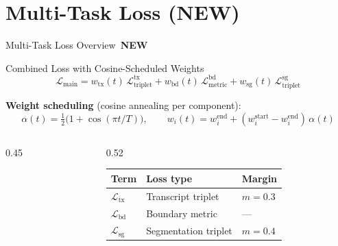 \documentclass[aspectratio=169,10pt]{beamer}
\newcommand{\Lcal}{\mathcal{L}}
\newcommand{\NEW}{\,{\scriptsize\colorbox{newgreen}{\color{white}\textbf{NEW}}}\,}
\begin{document}
\section{Multi-Task Loss (NEW)}

\begin{frame}{Multi-Task Loss Overview \NEW}

\begin{block}{Combined Loss with Cosine-Scheduled Weights}
\vspace{-0.2cm}
\[
  \Lcal_{\text{main}} = w_{\text{tx}}(t)\,\Lcal_{\text{triplet}}^{\text{tx}} + w_{\text{bd}}(t)\,\Lcal_{\text{metric}}^{\text{bd}} + w_{\text{sg}}(t)\,\Lcal_{\text{triplet}}^{\text{sg}}
\]
\end{block}

\textbf{Weight scheduling} (cosine annealing per component):
\[
  \alpha(t) = \tfrac{1}{2}\big(1 + \cos(\pi t / T)\big), \qquad w_i(t) = w_i^{\text{end}} + (w_i^{\text{start}} - w_i^{\text{end}})\,\alpha(t)
\]

\begin{columns}[T]
\begin{column}{0.45\textwidth}
\begin{center}
\end{center}
\end{column}
\begin{column}{0.52\textwidth}
{\small
\begin{tabular}{@{}lll@{}}
\textbf{Term} & \textbf{Loss type} & \textbf{Margin} \\
\midrule
$\Lcal_{\text{tx}}$ & Transcript triplet & $m=0.3$ \\
$\Lcal_{\text{bd}}$ & Boundary metric & --- \\
$\Lcal_{\text{sg}}$ & Segmentation triplet & $m=0.4$ \\
\end{tabular}
}
\end{column}
\end{columns}
\end{frame}
\end{document}
